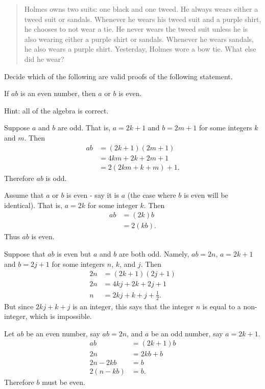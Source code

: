 \documentclass[11pt]{exam}
\begin{document}
\begin{quote}
Holmes owns two suits: one black and one tweed. He always wears either a tweed suit or sandals.  Whenever he wears his tweed suit and a purple shirt, he chooses to not wear a tie. He never wears the tweed suit unless he is also wearing either a purple shirt or sandals. Whenever he wears sandals, he also wears a purple shirt. Yesterday, Holmes wore a bow tie. What else did he wear?
\end{quote}




\newpage
Decide which of the following are valid proofs of the following statement.

\begin{center}
If $a b$ is an even number, then $a$ or $b$ is even.
\end{center}

Hint: all of the algebra is correct.
\begin{questions}
\question
Suppose $a$ and $b$ are odd.  That is, $a=2k+1$ and $b=2m+1$ for some integers $k$ and $m$. Then
\begin{align*}
ab &=(2k+1)(2m+1)\\
&=4km+2k+2m+1\\
&=2(2km+k+m)+1.
\end{align*}
Therefore $ab$ is odd.
\vfill

\question
Assume that $a$ or $b$ is even - say it is $a$ (the case where $b$ is even will be identical). That is, $a=2k$ for some integer $k$. Then
\begin{align*}
ab &=(2k)b\\
&=2(kb).
\end{align*}
Thus $ab$ is even.
\vfill

\question
Suppose that $ab$ is even but $a$ and $b$ are both odd. Namely, $ab = 2n$, $a=2k+1$ and $b=2j+1$ for some integers $n$, $k$, and $j$. Then
\begin{align*}
2n &=(2k+1)(2j+1)\\
2n &=4kj+2k+2j+1\\
n &= 2kj+k+j+\frac{1}{2}.
\end{align*}
But since $2kj+k+j$ is an integer, this says that the integer $n$ is equal to a non-integer, which is impossible.
\vfill

\question
Let $ab$ be an even number, say $ab=2n$, and $a$ be an odd number, say $a=2k+1$. %
\begin{align*}
ab &=(2k+1)b\\
2n &=2kb+b\\
2n-2kb&=b\\
2(n-kb)&=b.
\end{align*}
Therefore $b$ must be even.
\end{questions}
\end{document}

